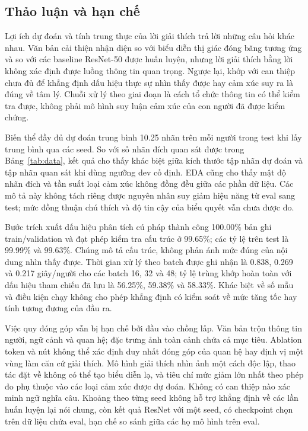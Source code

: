 \documentclass[conference]{IEEEtran}
\newcommand{\ev}[2]{#2}
\begin{document}
\subsection{Thảo luận và hạn chế}\label{sec:discussion}
Lợi ích dự đoán và tính trung thực của lời giải thích trả lời những câu hỏi khác nhau. Văn bản cải thiện nhận diện so với biểu diễn thị giác đóng băng tương ứng và so với các baseline ResNet-50 được huấn luyện, nhưng lời giải thích bằng lời không xác định được luồng thông tin quan trọng. Ngược lại, khớp với can thiệp chưa đủ để khẳng định dấu hiệu thực sự nhìn thấy được hay cảm xúc suy ra là đúng về tâm lý. Chuỗi xử lý theo giai đoạn là cách tổ chức thông tin có thể kiểm tra được, không phải mô hình suy luận cảm xúc của con người đã được kiểm chứng.

Biến thể đầy đủ dự đoán trung bình 10.25 nhãn trên mỗi người trong test khi lấy trung bình qua các seed. So với số nhãn đích quan sát được trong Bảng~\ref{tab:data}, kết quả cho thấy khác biệt giữa kích thước tập nhãn dự đoán và tập nhãn quan sát khi dùng ngưỡng dev cố định. EDA cũng cho thấy mật độ nhãn đích và tần suất loại cảm xúc không đồng đều giữa các phần dữ liệu. Các mô tả này không tách riêng được nguyên nhân suy giảm hiệu năng từ eval sang test; mức đồng thuận chú thích và độ tin cậy của biểu quyết vẫn chưa được đo.

Bước trích xuất dấu hiệu phân tích cú pháp thành công \ev{cue-parse_rate}{100.00}\% bản ghi train/validation và đạt phép kiểm tra cấu trúc ở \ev{cue-schema_rate}{99.65}\%; các tỷ lệ trên test là \ev{test-cue-parse_rate}{99.99}\% và \ev{test-cue-schema_rate}{99.63}\%. Chúng mô tả cấu trúc, không phản ánh mức đúng của nội dung nhìn thấy được. Thời gian xử lý theo batch được ghi nhận là \ev{batch-16-seconds}{0.838}, \ev{batch-32-seconds}{0.269} và \ev{batch-48-seconds}{0.217} giây/người cho các batch \ev{batch-16}{16}, \ev{batch-32}{32} và \ev{batch-48}{48}; tỷ lệ trùng khớp hoàn toàn với dấu hiệu tham chiếu đã lưu là \ev{batch-16-same}{56.25}\%, \ev{batch-32-same}{59.38}\% và \ev{batch-48-same}{58.33}\%. Khác biệt về số mẫu và điều kiện chạy không cho phép khẳng định có kiểm soát về mức tăng tốc hay tính tương đương của đầu ra.

Việc quy đóng góp vẫn bị hạn chế bởi đầu vào chồng lấp. Văn bản trộn thông tin người, ngữ cảnh và quan hệ; đặc trưng ảnh toàn cảnh chứa cả mục tiêu. Ablation token và nút không thể xác định duy nhất đóng góp của quan hệ hay định vị một vùng làm căn cứ giải thích. Mô hình giải thích nhìn ảnh một cách độc lập, thao tác đặt về không có thể tạo biểu diễn lạ, và tiêu chí mức giảm lớn nhất theo phép đo phụ thuộc vào các loại cảm xúc được dự đoán. Không có can thiệp nào xác minh ngữ nghĩa câu. Khoảng theo từng seed không hỗ trợ khẳng định về các lần huấn luyện lại nói chung, còn kết quả ResNet với một seed, có checkpoint chọn trên dữ liệu chứa eval, hạn chế so sánh giữa các họ mô hình trên eval.
\end{document}
